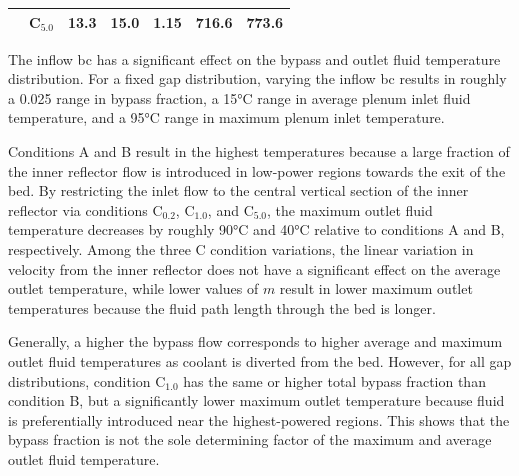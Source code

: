 \begin{table}[htb!]
{\begin{tabular}{|c |c| c c |c| c c |}
& C$_{5.0}$ & 13.3 & 15.0 & 1.15 & 716.6 & 773.6\Bstrut\\
\hline
\end{tabular}
}
\label{table:drag3}
\end{table}

The inflow \gls{bc} has a significant effect on the bypass and outlet fluid temperature distribution. For a fixed gap distribution, varying the inflow \gls{bc} results in roughly a 0.025 range in bypass fraction, a 15\si{\celsius} range in average plenum inlet fluid temperature, and a 95\si{\celsius} range in maximum plenum inlet temperature. 

Conditions A and B result in the highest temperatures because a large fraction of the inner reflector flow is introduced in low-power regions towards the exit of the bed. By restricting the inlet flow to the central vertical section of the inner reflector via conditions C$_\text{0.2}$, C$_\text{1.0}$, and C$_\text{5.0}$, the maximum outlet fluid temperature decreases by roughly 90\si{\celsius} and 40\si{\celsius} relative to conditions A and B, respectively.  Among the three C condition variations, the linear variation in velocity from the inner reflector does not have a significant effect on the average outlet temperature, while lower values of \(m\) result in lower maximum outlet temperatures because the fluid path length through the bed is longer. 
 
Generally, a higher the bypass flow corresponds to higher average and maximum outlet fluid temperatures as coolant is diverted from the bed. However, for all gap distributions, condition C$_\text{1.0}$ has the same or higher total bypass fraction than condition B, but a significantly lower maximum outlet temperature because fluid is preferentially introduced near the highest-powered regions. This shows that the bypass fraction is not the sole determining factor of the maximum and average outlet fluid temperature. 

